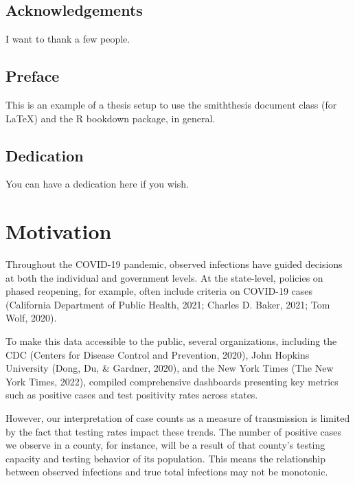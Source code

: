 \documentclass[12pt,twoside]{smiththesis}
\begin{document}
\hypertarget{acknowledgements}{%
\section*{Acknowledgements}\label{acknowledgements}}

I want to thank a few people.

\hypertarget{preface}{%
\section*{Preface}\label{preface}}

This is an example of a thesis setup to use the smiththesis document class
(for LaTeX) and the R bookdown package, in general.

\hypertarget{dedication}{%
\section*{Dedication}\label{dedication}}

You can have a dedication here if you wish.

\hypertarget{motivation}{%
\chapter{Motivation}\label{motivation}}

\vspace{.2 mm}
Throughout the COVID-19 pandemic, observed infections have guided decisions at both the individual and government levels. At the state-level, policies on phased reopening, for example, often include criteria on COVID-19 cases (California Department of Public Health, 2021; Charles D. Baker, 2021; Tom Wolf, 2020).

To make this data accessible to the public, several organizations, including the CDC (Centers for Disease Control and Prevention, 2020), John Hopkins University (Dong, Du, \& Gardner, 2020), and the New York Times (The New York Times, 2022), compiled comprehensive dashboards presenting key metrics such as positive cases and test positivity rates across states.

However, our interpretation of case counts as a measure of transmission is limited by the fact that testing rates impact these trends. The number of positive cases we observe in a county, for instance, will be a result of that county's testing capacity and testing behavior of its population. This means the relationship between observed infections and true total infections may not be monotonic.
\end{document}
